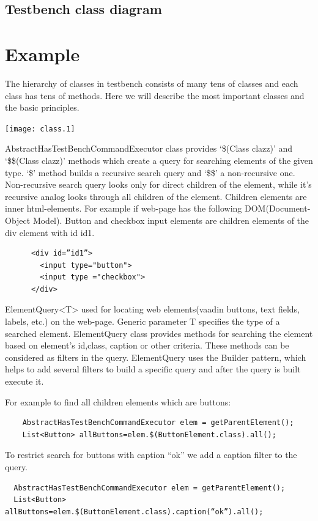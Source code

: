 \documentclass{article}
\begin{document}
  \subsection{Testbench class diagram}
  
  \section{Example}

  
  The hierarchy of classes in testbench consists of many tens of classes and each class has tens of methods.
  Here we will describe the most important classes and the basic principles.

    \texttt{[image: class.1]}
    
AbstractHasTestBenchCommandExecutor class provides  `\$(Class clazz)' and
`\$\$(Class clazz)' methods which create a query for searching elements of
the given type.
 `\$' method builds a recursive search query and `\$\$' a non-recursive one.
 Non-recursive search query looks only for direct children of the element, while it’s recursive analog looks
  through all children of the element. Children elements are inner html-elements.
   For example if web-page has the following DOM(Document-Object Model). 
   Button and checkbox input elements are children elements of the div element with id id1.
  \lstset{language=HTML}
    \begin{lstlisting}
      <div id=”id1”>
        <input type="button">
        <input type ="checkbox">
      </div>
  \end{lstlisting}
  
ElementQuery<T> used for locating web elements(vaadin buttons, text fields, labels, etc.) on the web-page.
 Generic parameter T specifies the type of a searched element. 
 ElementQuery class provides methods for searching the element based on element’s id,class,
  caption or other criteria. These methods can be considered as filters in the query.
   ElementQuery uses the Builder pattern, which helps to add several filters to build a specific query and after
    the query is built execute it.

For example to find all children elements which are buttons:
  \lstset{language=Java}
    \begin{lstlisting}
    AbstractHasTestBenchCommandExecutor elem = getParentElement();
    List<Button> allButtons=elem.$(ButtonElement.class).all();
  \end{lstlisting}
  
To restrict search for buttons with caption “ok” we add a caption filter to the query.
  \lstset{language=Java}
  \begin{lstlisting}
  AbstractHasTestBenchCommandExecutor elem = getParentElement();
  List<Button> allButtons=elem.$(ButtonElement.class).caption(“ok”).all();
  \end{lstlisting}
  
\end{document}

